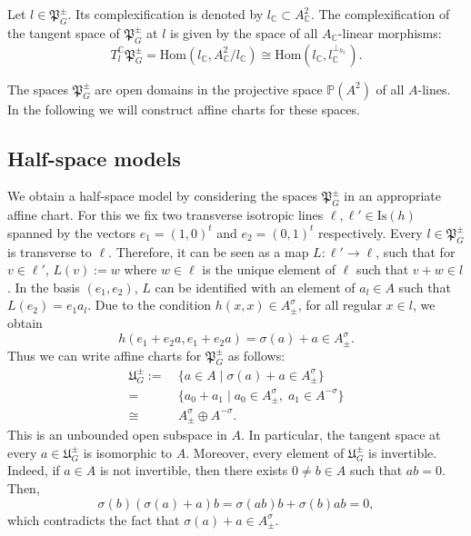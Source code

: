 \documentclass[oneside,11pt]{amsart}
\theoremstyle{definition}
\theoremstyle{remark}
\numberwithin{thm}{section}
\numberwithin{equation}{section}
\begin{document}
Let $l\in\mathfrak{P}_G^\pm$. Its complexification is denoted by $l_\mathbb C\subset A_\mathbb C^2$. The complexification of the tangent space of $\mathfrak P_G^\pm$ at $l$ is given by the space of all $A_\mathbb C$-linear morphisms:
\begin{equation}\label{eq:o(1,1)-comp.tang}
T_l^\mathbb C\mathfrak{P}_G^\pm=\mathrm{Hom}(l_\mathbb C,A_\mathbb C^2/l_\mathbb C)\cong \mathrm{Hom}(l_\mathbb C,l_\mathbb C^{\perp_{ h_\mathbb C}}).    
\end{equation}


The spaces $\mathfrak{P}_G^\pm$ are open domains in  the projective space $\mathbb{P}(A^2)$ of all $A$-lines. In the following we will construct affine charts for these spaces. 


\subsection{Half-space models}\label{sec:halfspace_O}
We obtain a half-space model by considering the spaces $\mathfrak{P}_G^\pm$ in an appropriate affine chart. For this we fix two transverse isotropic lines $\ell,\ell'\in \mathrm{Is}( h)$ spanned by the vectors $e_1=(1,0)^t$ and $e_2=(0,1)^t$ respectively. Every $l\in \mathfrak{P}_G^\pm$ is transverse to $\ell$. Therefore, it can be seen as a map $L\colon\ell'\to\ell$, such that for $v\in\ell'$, $L(v):=w$ where $w\in\ell$ is the unique element of $\ell$ such that $v+w\in l$. In the basis $(e_1,e_2)$, $L$ can be identified with an element of $a_l\in A$ such that $L(e_2)= e_1a_l$. Due to the condition $ h(x,x)\in A^\sigma_\pm$, for all regular $x\in l$, we obtain 
\[h(e_1+e_2a,e_1+e_2a)=\sigma(a)+a\in A^\sigma_\pm.\] Thus we can write affine charts for $\mathfrak{P}_G^\pm$ as follows:
\begin{align*}
    \mathfrak{U}_G^\pm:=&\ \{a\in A\mid \sigma(a)+a\in A^\sigma_\pm\}\\
    =&\ \{a_0+a_1\mid a_0\in A^\sigma_\pm,\;a_1\in A^{-\sigma}\}\\
    \cong&\ A^\sigma_\pm\oplus A^{-\sigma}.
\end{align*}
This is an unbounded open subspace in $A$. In particular, the tangent space at every $a\in \mathfrak{U}_G^\pm$ is isomorphic to $A$. Moreover, every element of $\mathfrak{U}_G^\pm$ is invertible. Indeed, if $a\in A$ is not invertible, then there exists $0\neq b\in A$ such that $ab=0$. Then,  
$$
\sigma(b)(\sigma(a)+a)b=\sigma(ab)b+\sigma(b)ab=0,
$$
which contradicts the fact that $\sigma(a)+a\in A^\sigma_\pm$.
\end{document}
